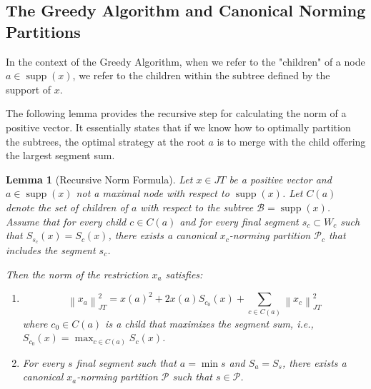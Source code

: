 \documentclass[11pt,a4paper]{amsart}
\newtheorem{lemma}[theorem]{Lemma}
\newcommand{\JT}{JT}
\newcommand{\norm}[1]{\left\lVert#1\right\rVert}
\newcommand{\supp}{\operatorname{supp}}
\begin{document}
\subsection{The Greedy Algorithm and Canonical Norming Partitions}

In the context of the Greedy Algorithm, when we refer to the "children" of a node $a \in \supp(x)$, we refer to the children within the subtree defined by the support of $x$.

The following lemma provides the recursive step for calculating the norm of a positive vector. It essentially states that if we know how to optimally partition the subtrees, the optimal strategy at the root $a$ is to merge with the child offering the largest segment sum.

\begin{lemma}[Recursive Norm Formula]\label{lemma:greedy_step}
    Let $x \in \JT$ be a positive vector and $a \in \supp(x)$ not a maximal node with respect to $\supp(x)$. Let $C(a)$ denote the set of children of $a$ with respect to the subtree $\mathcal{B} = \supp(x) $. Assume that for every child $c \in C(a)$ and for every final segment $s_c \subset W_c $ such that
     $S_{s_c}(x) = S_c(x)$, there exists a canonical $x_c$-norming partition $\mathcal{P}_c$ that includes the segment $s_c$.
    
    Then the norm of the restriction $x_a$ satisfies:
    \begin{enumerate}
    \item
    \begin{equation}
        \norm{x_a}_{\JT}^2 = x(a)^2 + 2x(a)S_{c_0}(x) + \sum_{c \in C(a)} \norm{x_c}_{\JT}^2
    \end{equation}
    where $c_0 \in C(a)$ is a child that maximizes the segment sum, i.e., $S_{c_0}(x) = \max_{c \in C(a)} S_c(x)$.
    \item For every $s$ final segment such that $a = \min s$ and $S_a = S_s$, there exists a canonical $x_a$-norming partition
    $\mathcal{P}$ such that $s \in \mathcal{P}$.
    \end{enumerate}
\end{lemma}
\end{document}
